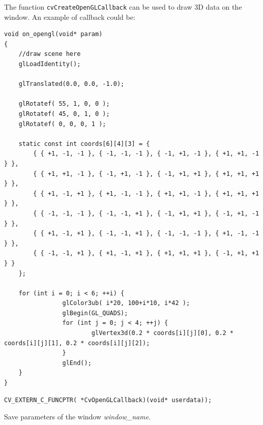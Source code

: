 \begin{description}
\end{description}

The function \texttt{cvCreateOpenGLCallback} can be used to draw 3D data on the window.  An example of callback could be:
\begin{lstlisting}
void on_opengl(void* param)
{
    //draw scene here
    glLoadIdentity();

    glTranslated(0.0, 0.0, -1.0);

    glRotatef( 55, 1, 0, 0 );
    glRotatef( 45, 0, 1, 0 );
    glRotatef( 0, 0, 0, 1 );

    static const int coords[6][4][3] = {
        { { +1, -1, -1 }, { -1, -1, -1 }, { -1, +1, -1 }, { +1, +1, -1 } },
        { { +1, +1, -1 }, { -1, +1, -1 }, { -1, +1, +1 }, { +1, +1, +1 } },
        { { +1, -1, +1 }, { +1, -1, -1 }, { +1, +1, -1 }, { +1, +1, +1 } },
        { { -1, -1, -1 }, { -1, -1, +1 }, { -1, +1, +1 }, { -1, +1, -1 } },
        { { +1, -1, +1 }, { -1, -1, +1 }, { -1, -1, -1 }, { +1, -1, -1 } },
        { { -1, -1, +1 }, { +1, -1, +1 }, { +1, +1, +1 }, { -1, +1, +1 } }
    };

    for (int i = 0; i < 6; ++i) {
                glColor3ub( i*20, 100+i*10, i*42 );
                glBegin(GL_QUADS);
                for (int j = 0; j < 4; ++j) {
                        glVertex3d(0.2 * coords[i][j][0], 0.2 * coords[i][j][1], 0.2 * coords[i][j][2]);
                }
                glEnd();
    }
}
\end{lstlisting}

\begin{lstlisting}
CV_EXTERN_C_FUNCPTR( *CvOpenGLCallback)(void* userdata));
\end{lstlisting}


Save parameters of the window \emph{window\_name}.

